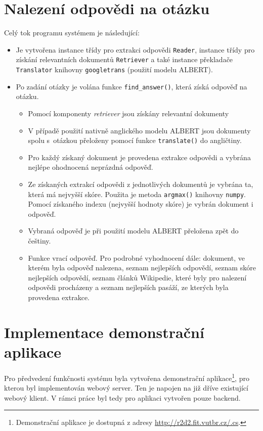 \section*{Nalezení odpovědi na otázku}
Celý tok programu systémem je následující:
\begin{itemize}
    \item Je vytvořena instance třídy pro extrakci odpovědi \texttt{Reader}, instance třídy pro získání relevantních dokumentů \texttt{Retriever} a také instance překladače \texttt{Translator} knihovny \texttt{googletrans} (použití modelu ALBERT).
    
    \item Po zadání otázky je volána funkce \texttt{find\_answer()}, která získá odpověď na otázku.
    \begin{itemize}
        \item Pomocí komponenty \emph{retriever} jsou získány relevantní dokumenty
        \item V případě použití nativně anglického modelu ALBERT jsou dokumenty spolu s~otázkou přeloženy pomocí funkce \texttt{translate()} do angličtiny.
        \item Pro každý získaný dokument je provedena extrakce odpovědi a vybrána nejlépe ohodnocená neprázdná odpověď.
        \item Ze získaných extrakcí odpovědi z jednotlivých dokumentů je vybrána ta, která má nejvyšší skóre. Použita je metoda \texttt{argmax()} knihovny \texttt{numpy}. Pomocí získaného indexu (nejvyšší hodnoty skóre) je vybrán dokument i odpověď.
        \item Vybraná odpověď je při použití modelu ALBERT přeložena zpět do češtiny.
        \item Funkce vrací odpověď. Pro podrobné vyhodnocení dále: dokument, ve kterém byla odpověď nalezena, seznam nejlepších odpovědí, seznam skóre nejlepších odpovědí, seznam článků Wikipedie, které byly pro nalezení odpovědi procházeny a seznam nejlepších pasáží, ze kterých byla provedena extrakce.
    \end{itemize}
\end{itemize}

\section*{Implementace demonstrační aplikace}
Pro předvedení funkčnosti systému byla vytvořena demonstrační aplikace\footnote{Demonstrační aplikace je dostupná z adresy \url{http://r2d2.fit.vutbr.cz/.cs}.}, pro kterou byl implementován webový server. Ten je napojen na již dříve existující webový klient. V rámci práce byl tedy pro aplikaci vytvořen pouze backend.

